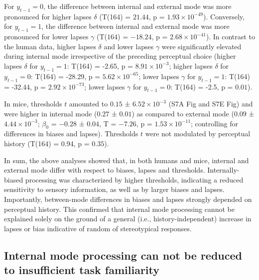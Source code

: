 \documentclass[
]{article}
\begin{document}
For \(y_{t-1} = 0\), the difference between internal and external mode
was more pronounced for higher lapses \(\delta\) (T(164) = \(21.44\), p
= \(\ensuremath{1.93\times 10^{-49}}\)). Conversely, for
\(y_{t-1} = 1\), the difference between internal and external mode was
more pronounced for lower lapses \(\gamma\) (T(\(164\)) = \(-18.24\), p
= \(\ensuremath{2.68\times 10^{-41}}\)). In contrast to the human data,
higher lapses \(\delta\) and lower lapses \(\gamma\) were significantly
elevated during internal mode irrespective of the preceding perceptual
choice (higher lapses \(\delta\) for \(y_{t-1} = 1\): T(164) = -2.65, p
= \(\ensuremath{8.91\times 10^{-3}}\); higher lapses \(\delta\) for
\(y_{t-1} = 0\): T(164) = -28.29, p =
\(\ensuremath{5.62\times 10^{-65}}\); lower lapses \(\gamma\) for
\(y_{t-1} = 1\): T(164) = -32.44, p =
\(\ensuremath{2.92\times 10^{-73}}\); lower lapses \(\gamma\) for
\(y_{t-1} = 0\): T(164) = -2.5, p = \(0.01\)).

In mice, thresholds \(t\) amounted to \(0.15\) ±
\(\ensuremath{6.52\times 10^{-3}}\) (S7A Fig and S7E Fig) and
were higher in internal mode (\(0.27\) ± \(0.01\)) as compared to
external mode (\(0.09\) ± \(\ensuremath{4.44\times 10^{-3}}\);
\(\beta_0\) = \(-0.28\) ± \(0.04\), T = \(-7.26\), p =
\(\ensuremath{1.53\times 10^{-11}}\); controlling for differences in
biases and lapses). Thresholds \(t\) were not modulated by perceptual
history (T(164) = 0.94, p = \(0.35\)).

In sum, the above analyses showed that, in both humans and mice,
internal and external mode differ with respect to biases, lapses and
thresholds. Internally-biased processing was characterized by higher
thresholds, indicating a reduced sensitivity to sensory information, as
well as by larger biases and lapses. Importantly, between-mode
differences in biases and lapses strongly depended on perceptual
history. This confirmed that internal mode processing cannot be
explained solely on the ground of a general (i.e., history-independent)
increase in lapses or bias indicative of random of stereotypical
responses.

\hypertarget{internal-mode-processing-can-not-be-reduced-to-insufficient-task-familiarity}{%
\subsection{Internal mode processing can not be reduced to insufficient
task
familiarity}\label{internal-mode-processing-can-not-be-reduced-to-insufficient-task-familiarity}}
\end{document}
